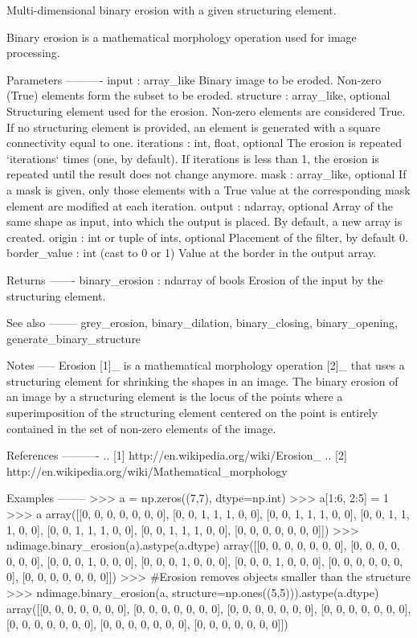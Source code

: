 \begin{DoxyVerb}Multi-dimensional binary erosion with a given structuring element.

Binary erosion is a mathematical morphology operation used for image
processing.

Parameters
----------
input : array_like
    Binary image to be eroded. Non-zero (True) elements form
    the subset to be eroded.
structure : array_like, optional
    Structuring element used for the erosion. Non-zero elements are
    considered True. If no structuring element is provided, an element
    is generated with a square connectivity equal to one.
iterations : {int, float}, optional
    The erosion is repeated `iterations` times (one, by default).
    If iterations is less than 1, the erosion is repeated until the
    result does not change anymore.
mask : array_like, optional
    If a mask is given, only those elements with a True value at
    the corresponding mask element are modified at each iteration.
output : ndarray, optional
    Array of the same shape as input, into which the output is placed.
    By default, a new array is created.
origin : int or tuple of ints, optional
    Placement of the filter, by default 0.
border_value : int (cast to 0 or 1)
    Value at the border in the output array.

Returns
-------
binary_erosion : ndarray of bools
    Erosion of the input by the structuring element.

See also
--------
grey_erosion, binary_dilation, binary_closing, binary_opening,
generate_binary_structure

Notes
-----
Erosion [1]_ is a mathematical morphology operation [2]_ that uses a
structuring element for shrinking the shapes in an image. The binary
erosion of an image by a structuring element is the locus of the points
where a superimposition of the structuring element centered on the point
is entirely contained in the set of non-zero elements of the image.

References
----------
.. [1] http://en.wikipedia.org/wiki/Erosion_%
.. [2] http://en.wikipedia.org/wiki/Mathematical_morphology

Examples
--------
>>> a = np.zeros((7,7), dtype=np.int)
>>> a[1:6, 2:5] = 1
>>> a
array([[0, 0, 0, 0, 0, 0, 0],
       [0, 0, 1, 1, 1, 0, 0],
       [0, 0, 1, 1, 1, 0, 0],
       [0, 0, 1, 1, 1, 0, 0],
       [0, 0, 1, 1, 1, 0, 0],
       [0, 0, 1, 1, 1, 0, 0],
       [0, 0, 0, 0, 0, 0, 0]])
>>> ndimage.binary_erosion(a).astype(a.dtype)
array([[0, 0, 0, 0, 0, 0, 0],
       [0, 0, 0, 0, 0, 0, 0],
       [0, 0, 0, 1, 0, 0, 0],
       [0, 0, 0, 1, 0, 0, 0],
       [0, 0, 0, 1, 0, 0, 0],
       [0, 0, 0, 0, 0, 0, 0],
       [0, 0, 0, 0, 0, 0, 0]])
>>> #Erosion removes objects smaller than the structure
>>> ndimage.binary_erosion(a, structure=np.ones((5,5))).astype(a.dtype)
array([[0, 0, 0, 0, 0, 0, 0],
       [0, 0, 0, 0, 0, 0, 0],
       [0, 0, 0, 0, 0, 0, 0],
       [0, 0, 0, 0, 0, 0, 0],
       [0, 0, 0, 0, 0, 0, 0],
       [0, 0, 0, 0, 0, 0, 0],
       [0, 0, 0, 0, 0, 0, 0]])\end{DoxyVerb}
